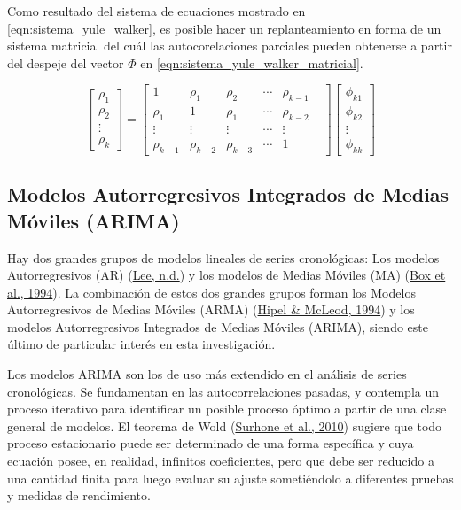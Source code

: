 \documentclass[
]{article}
\begin{document}
Como resultado del sistema de ecuaciones mostrado en
\eqref{eqn:sistema_yule_walker}, es posible hacer un replanteamiento en
forma de un sistema matricial del cuál las autocorelaciones parciales
pueden obtenerse a partir del despeje del vector \(\Phi\) en
\eqref{eqn:sistema_yule_walker_matricial}.

\begin{equation}
\label{eqn:sistema_yule_walker_matricial}
\left[ \begin{array}{c} \rho_1 \\ \rho_2 \\ \vdots \\ \rho_k \end{array} \right] = \begin{bmatrix} 1 & \rho_1 & \rho_2 & \cdots & \rho_{k-1} \\ \rho_1 & 1 & \rho_1 & \cdots & \rho_{k-2} \\ \vdots & \vdots & \vdots & \cdots & \vdots \\ \rho_{k-1} & \rho_{k-2} & \rho_{k-3} & \cdots & 1 &\end{bmatrix} \left[ \begin{array}{c} \phi_{k1} \\ \phi_{k2}  \\ \vdots \\ \phi_{kk} \end{array} \right]\end{equation}

\subsection{Modelos Autorregresivos Integrados de Medias Móviles (ARIMA)}

Hay dos grandes grupos de modelos lineales de series cronológicas: Los
modelos Autorregresivos (AR) (\protect\hyperlink{ref-Lee}{Lee, n.d.}) y
los modelos de Medias Móviles (MA)
(\protect\hyperlink{ref-box-jenkins}{Box et al., 1994}). La combinación
de estos dos grandes grupos forman los Modelos Autorregresivos de Medias
Móviles (ARMA) (\protect\hyperlink{ref-Hipel}{Hipel \& McLeod, 1994}) y
los modelos Autorregresivos Integrados de Medias Móviles (ARIMA), siendo
este último de particular interés en esta investigación.

Los modelos ARIMA son los de uso más extendido en el análisis de series
cronológicas. Se fundamentan en las autocorrelaciones pasadas, y
contempla un proceso iterativo para identificar un posible proceso
óptimo a partir de una clase general de modelos. El teorema de Wold
(\protect\hyperlink{ref-Wold}{Surhone et al., 2010}) sugiere que todo
proceso estacionario puede ser determinado de una forma específica y
cuya ecuación posee, en realidad, infinitos coeficientes, pero que debe
ser reducido a una cantidad finita para luego evaluar su ajuste
sometiéndolo a diferentes pruebas y medidas de rendimiento.
\end{document}

